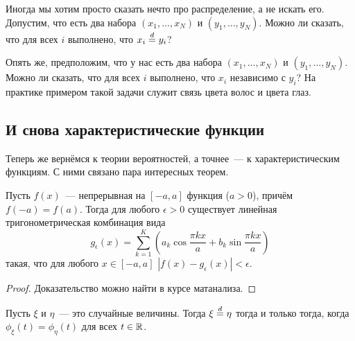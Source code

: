 \begin{example}
	Иногда мы хотим просто сказать нечто про распределение, а не искать его. 
	Допустим, что есть два набора \((x_{1}, \dots, x_{N})\) и \((y_{1}, \dots, 
	y_{N})\). Можно ли сказать, что для всех \(i\) выполнено, что \(x_{i} 
	\overset{d}{=} y_{i}\)?
\end{example}

\begin{example}
	Опять же, предположим, что у нас есть два набора \((x_{1}, \dots, x_{N})\) 
	и \((y_{1}, \dots, y_{N})\). Можно ли сказать, что для всех \(i\) 
	выполнено, что \(x_{i}\) независимо с \(y_{i}\)? На практике примером такой 
	задачи служит связь цвета волос и цвета глаз.
\end{example}

\subsection{И снова характеристические функции}
Теперь же вернёмся к теории вероятностей, а точнее~--- к характеристическим 
функциям. С ними связано пара интересных теорем.\
\begin{problem}[Вейерштрасс]
	Пусть \(f(x)\)~--- непрерывная на \([-a, a]\) функция (\(a > 0\)), причём 
	\(f(-a) = f(a)\). Тогда для любого \(\epsilon > 0\) существует линейная 
	тригонометрическая комбинация вида
	\[
		g_{\epsilon}(x) = \sum_{k = 1}^{K} \left(a_{k}\cos\frac{\pi k x}{a} + 
		b_{k}\sin \frac{\pi k x}{a}\right)
	\]
	такая, что для любого \(x \in [-a, a]\) \(|f(x) - g_{\epsilon}(x)| < 
	\epsilon\).
\end{problem}
\begin{proof}
	Доказательство можно найти в курсе матанализа.
\end{proof}
\begin{theorem}[единственности]
	Пусть \(\xi\) и \(\eta\)~--- это случайные величины. Тогда \(\xi \overset{d}{=} 
	\eta\) тогда и только тогда, когда \(\phi_{\xi}(t) = \phi_{\eta}(t)\) для 
	всех \(t \in \mathbb{R}\).
\end{theorem}
